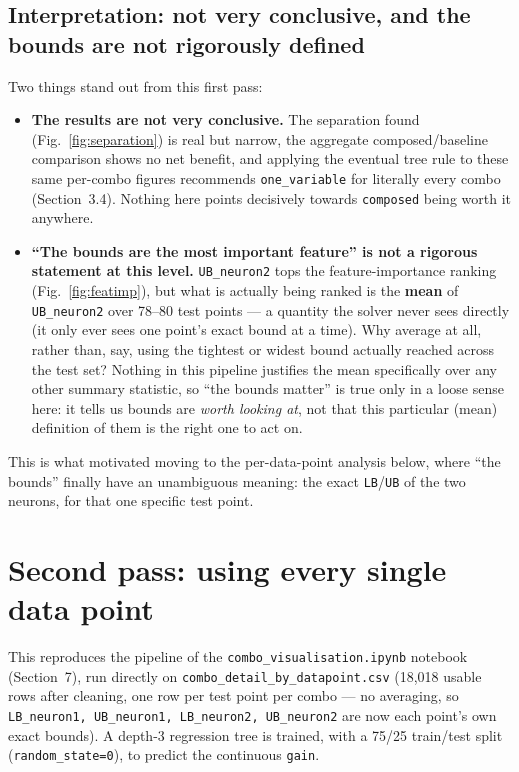 \documentclass[11pt,a4paper]{article}
\begin{document}
\subsection{Interpretation: not very conclusive, and the bounds are not rigorously defined}
Two things stand out from this first pass:
\begin{itemize}
  \item \textbf{The results are not very conclusive.} The separation found (Fig.~\ref{fig:separation}) is real but narrow, the aggregate composed/baseline comparison shows no net benefit, and applying the eventual tree rule to these same per-combo figures recommends \texttt{one\_variable} for literally every combo (Section~3.4). Nothing here points decisively towards \texttt{composed} being worth it anywhere.
  \item \textbf{``The bounds are the most important feature'' is not a rigorous statement at this level.} \texttt{UB\_neuron2} tops the feature-importance ranking (Fig.~\ref{fig:featimp}), but what is actually being ranked is the \textbf{mean} of \texttt{UB\_neuron2} over 78--80 test points --- a quantity the solver never sees directly (it only ever sees one point's exact bound at a time). Why average at all, rather than, say, using the tightest or widest bound actually reached across the test set? Nothing in this pipeline justifies the mean specifically over any other summary statistic, so ``the bounds matter'' is true only in a loose sense here: it tells us bounds are \emph{worth looking at}, not that this particular (mean) definition of them is the right one to act on.
\end{itemize}
This is what motivated moving to the per-data-point analysis below, where ``the bounds'' finally have an unambiguous meaning: the exact \texttt{LB}/\texttt{UB} of the two neurons, for that one specific test point.

\clearpage

\section{Second pass: using every single data point}
This reproduces the pipeline of the \texttt{combo\_visualisation.ipynb} notebook (Section~7), run directly on \texttt{combo\_detail\_by\_datapoint.csv} (18{,}018 usable rows after cleaning, one row per test point per combo --- no averaging, so \texttt{LB\_neuron1, UB\_neuron1, LB\_neuron2, UB\_neuron2} are now each point's own exact bounds). A depth-3 regression tree is trained, with a 75/25 train/test split (\texttt{random\_state=0}), to predict the continuous \texttt{gain}.
\end{document}
